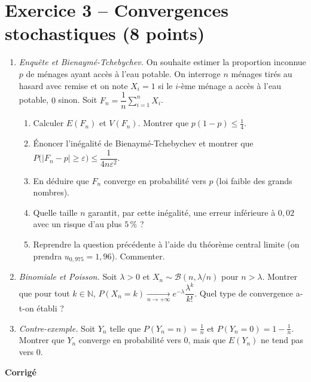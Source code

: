 \documentclass[11pt,a4paper]{article}
\begin{document}
\section*{Exercice 3 -- Convergences stochastiques (8 points)}
\begin{enumerate}
  \item \emph{Enquête et Bienaymé-Tchebychev.} On souhaite estimer la proportion inconnue $p$
  de ménages ayant accès à l'eau potable. On interroge $n$ ménages tirés au hasard avec remise et
  on note $X_i = 1$ si le $i$-ème ménage a accès à l'eau potable, $0$ sinon. Soit $F_n = \dfrac1n\sum_{i=1}^n X_i$.
  \begin{enumerate}[label=\alph*)]
    \item Calculer $E(F_n)$ et $V(F_n)$. Montrer que $p(1-p) \leqslant \frac14$.
    \item Énoncer l'inégalité de Bienaymé-Tchebychev et montrer que
    $P\big(|F_n - p| \geqslant \varepsilon\big) \leqslant \dfrac{1}{4n\varepsilon^2}$.
    \item En déduire que $F_n$ converge en probabilité vers $p$ (loi faible des grands nombres).
    \item Quelle taille $n$ garantit, par cette inégalité, une erreur inférieure à $0{,}02$ avec un risque d'au plus $5\,\%$ ?
    \item Reprendre la question précédente à l'aide du théorème central limite
    (on prendra $u_{0{,}975} = 1{,}96$). Commenter.
  \end{enumerate}
  \item \emph{Binomiale et Poisson.} Soit $\lambda > 0$ et $X_n \sim \mathcal{B}(n, \lambda/n)$ pour $n > \lambda$.
  Montrer que pour tout $k \in \mathbb{N}$, $P(X_n = k) \xrightarrow[n\to+\infty]{} e^{-\lambda}\dfrac{\lambda^k}{k!}$.
  Quel type de convergence a-t-on établi ?
  \item \emph{Contre-exemple.} Soit $Y_n$ telle que $P(Y_n = n) = \frac1n$ et $P(Y_n = 0) = 1 - \frac1n$.
  Montrer que $Y_n$ converge en probabilité vers $0$, mais que $E(Y_n)$ ne tend pas vers $0$.
\end{enumerate}

\newpage
\begin{center}{\Large\bfseries Corrigé}\end{center}
\end{document}

